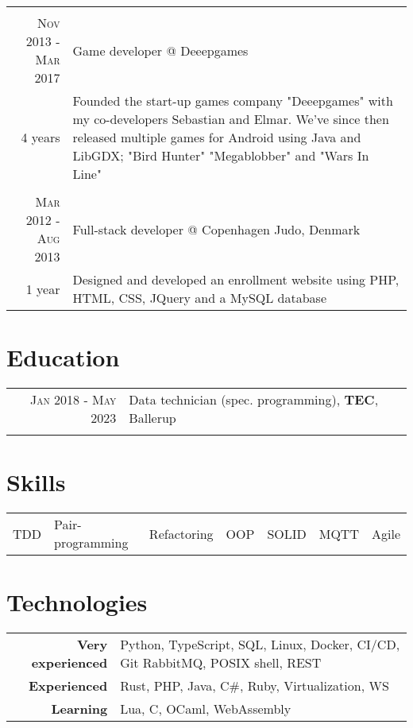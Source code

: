 \documentclass[a4paper,10pt]{article}
\begin{document}
\begin{tabular}{r|p{13cm}}
	\multicolumn{2}{c}{}                                                             \\
	\textsc{Nov 2013 - Mar 2017} & Game developer @ Deeepgames                       \\ \footnotesize{4 years}&\footnotesize{Founded the start-up games company "Deeepgames" with my co-developers Sebastian and Elmar. We've since then released multiple games for Android using Java and LibGDX; "Bird Hunter" "Megablobber" and "Wars In Line"}\\
	\multicolumn{2}{c}{}                                                             \\
	\textsc{Mar 2012 - Aug 2013} & Full-stack developer @ Copenhagen Judo, Denmark   \\ \footnotesize{1 year}&\footnotesize{Designed and developed an enrollment website using PHP, HTML, CSS, JQuery and a MySQL database}\\
\end{tabular}

\section{Education}
\begin{tabular}{rl}
	\textsc{Jan 2018 - May 2023} & Data technician (spec. programming), \textbf{TEC}, Ballerup \\ & \\
\end{tabular}

\section{Skills}
\begin{tabular}{lllllll}
	TDD & Pair-programming & Refactoring & OOP & SOLID & MQTT & Agile \\
\end{tabular}

\section{Technologies}
\begin{tabular}{rl}
	\textbf{Very experienced} & Python, TypeScript, SQL, Linux, Docker, CI/CD, Git  RabbitMQ, POSIX shell, REST \\
	\textbf{Experienced}      & Rust, PHP, Java, C\#, Ruby, Virtualization, WS                                  \\
	\textbf{Learning}         & Lua, C, OCaml, WebAssembly
\end{tabular}
\end{document}
